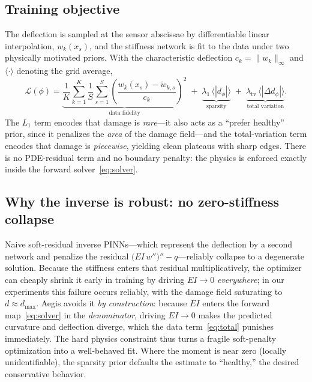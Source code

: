 \documentclass[11pt]{article}
\newcommand{\EI}{\mathit{EI}}
\newcommand{\xs}{x_{s}}
\begin{document}
\subsection{Training objective}
The deflection is sampled at the sensor abscissae by differentiable linear
interpolation, $w_k(\xs)$, and the stiffness network is fit to the data under two
physically motivated priors. With the characteristic deflection $c_k=\|w_k\|_\infty$
and $\langle\cdot\rangle$ denoting the grid average,
\begin{equation}
  \mathcal{L}(\phi) =
  \underbrace{\frac1K\sum_{k=1}^{K}\frac1S\sum_{s=1}^{S}
    \!\left(\frac{w_k(\xs)-\tilde w_{k,s}}{c_k}\right)^{\!2}}_{\text{data fidelity}}
  \;+\;
  \underbrace{\lambda_{1}\,\bigl\langle |d_\phi|\bigr\rangle}_{\text{sparsity}}
  \;+\;
  \underbrace{\lambda_{\mathrm{tv}}\,\bigl\langle |\Delta d_\phi|\bigr\rangle}_{\text{total variation}} .
  \label{eq:total}
\end{equation}
The $L_1$ term encodes that damage is \emph{rare}---it also acts as a ``prefer
healthy'' prior, since it penalizes the \emph{area} of the damage field---and the
total-variation term encodes that damage is \emph{piecewise}, yielding clean
plateaus with sharp edges. There is no PDE-residual term and no boundary penalty:
the physics is enforced exactly inside the forward solver~\eqref{eq:solver}.

\subsection{Why the inverse is robust: no zero-stiffness collapse}
Naive soft-residual inverse PINNs---which represent the deflection by a second
network and penalize the residual $\big(\EI\,w''\big)''-q$---reliably collapse to a
degenerate solution. Because the stiffness enters that residual multiplicatively,
the optimizer can cheaply shrink it early in training by driving $\EI\to 0$
\emph{everywhere}; in our experiments this failure occurs reliably, with the damage
field saturating to $d\!\approx\!d_{\max}$. Aegis avoids it \emph{by construction}:
because $\EI$ enters the forward map~\eqref{eq:solver} in the \emph{denominator},
driving $\EI\to 0$ makes the predicted curvature and deflection diverge, which the
data term~\eqref{eq:total} punishes immediately. The hard physics constraint thus
turns a fragile soft-penalty optimization into a well-behaved fit. Where the moment
is near zero (locally unidentifiable), the sparsity prior defaults the estimate to
``healthy,'' the desired conservative behavior.
\end{document}

